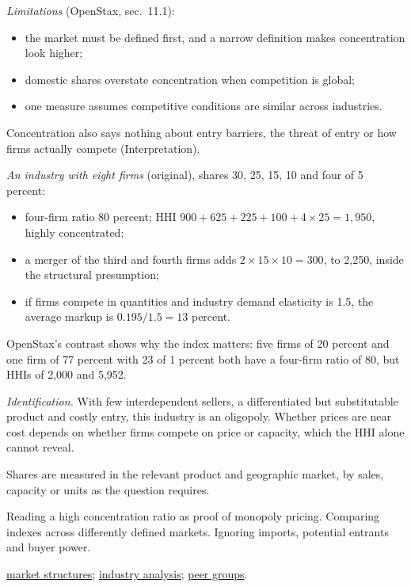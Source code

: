 \begin{qfmethod}
\emph{Limitations} (OpenStax, sec.~11.1):
\begin{itemize}
\item the market must be defined first, and a narrow definition makes concentration look higher;
\item domestic shares overstate concentration when competition is global;
\item one measure assumes competitive conditions are similar across industries.
\end{itemize}
Concentration also says nothing about entry barriers, the threat of entry or how firms actually compete (Interpretation).

 \emph{An industry with eight firms} (original), shares 30, 25, 15, 10 and four of 5 percent:
\begin{itemize}
\item four-firm ratio 80 percent; HHI $900+625+225+100+4\times25=1{,}950$, highly concentrated;
\item a merger of the third and fourth firms adds $2\times15\times10=300$, to 2,250, inside the structural presumption;
\item if firms compete in quantities and industry demand elasticity is 1.5, the average markup is $0.195/1.5=13$ percent.
\end{itemize}
OpenStax's contrast shows why the index matters: five firms of 20 percent and one firm of 77 percent with 23 of 1 percent both have a four-firm ratio of 80, but HHIs of 2,000 and 5,952.

\emph{Identification.} With few interdependent sellers, a differentiated but substitutable product and costly entry, this industry is an oligopoly. Whether prices are near cost depends on whether firms compete on price or capacity, which the HHI alone cannot reveal.

 Shares are measured in the relevant product and geographic market, by sales, capacity or units as the question requires.

 Reading a high concentration ratio as proof of monopoly pricing. Comparing indexes across differently defined markets. Ignoring imports, potential entrants and buyer power.

 \hyperref[def:market-structures-pricing]{market structures}; \hyperref[meth:industry-analysis]{industry analysis}; \hyperref[meth:peer-group-selection]{peer groups}.

\end{qfmethod}
